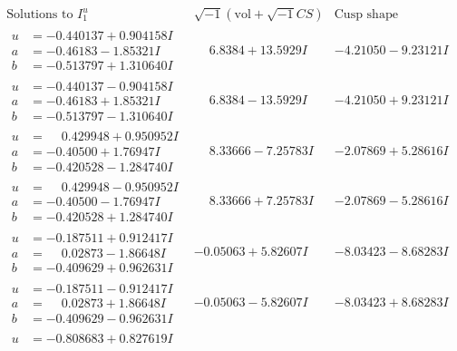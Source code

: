 \documentclass[1p]{elsarticle_modified}
\theoremstyle{definition}
\newcommand{\I}{\sqrt{-1}}
\begin{document}
$$\begin{array}{c|c|c}  
\text{Solutions to }I^u_{1}& \I (\text{vol} + \sqrt{-1}CS) & \text{Cusp shape}\\
 \hline 
\begin{aligned}
u &= -0.440137 + 0.904158 I \\
a &= -0.46183 - 1.85321 I \\
b &= -0.513797 + 1.310640 I\end{aligned}
 & \phantom{-}6.8384 + 13.5929 I & -4.21050 - 9.23121 I \\ \hline\begin{aligned}
u &= -0.440137 - 0.904158 I \\
a &= -0.46183 + 1.85321 I \\
b &= -0.513797 - 1.310640 I\end{aligned}
 & \phantom{-}6.8384 - 13.5929 I & -4.21050 + 9.23121 I \\ \hline\begin{aligned}
u &= \phantom{-}0.429948 + 0.950952 I \\
a &= -0.40500 + 1.76947 I \\
b &= -0.420528 - 1.284740 I\end{aligned}
 & \phantom{-}8.33666 - 7.25783 I & -2.07869 + 5.28616 I \\ \hline\begin{aligned}
u &= \phantom{-}0.429948 - 0.950952 I \\
a &= -0.40500 - 1.76947 I \\
b &= -0.420528 + 1.284740 I\end{aligned}
 & \phantom{-}8.33666 + 7.25783 I & -2.07869 - 5.28616 I \\ \hline\begin{aligned}
u &= -0.187511 + 0.912417 I \\
a &= \phantom{-}0.02873 - 1.86648 I \\
b &= -0.409629 + 0.962631 I\end{aligned}
 & -0.05063 + 5.82607 I & -8.03423 - 8.68283 I \\ \hline\begin{aligned}
u &= -0.187511 - 0.912417 I \\
a &= \phantom{-}0.02873 + 1.86648 I \\
b &= -0.409629 - 0.962631 I\end{aligned}
 & -0.05063 - 5.82607 I & -8.03423 + 8.68283 I \\ \hline\begin{aligned}
u &= -0.808683 + 0.827619 I \\

\end{aligned}
\end{array}$$
\end{document}
